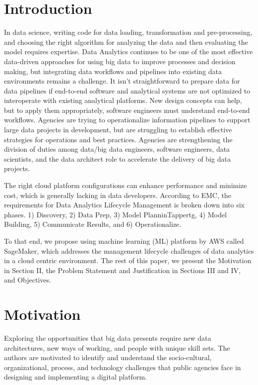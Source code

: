 \documentclass[conference]{IEEEtran}
\begin{document}
\section{Introduction}
In data science, writing code for data loading, transformation and pre-processing, and choosing the right algorithm for analyzing the data and then evaluating the model requires expertise.  Data Analytics continues to be one of the most effective data-driven approaches for using big data to improve processes and decision making, but integrating data workflows and pipelines into existing data environments remains a challenge. It isn't straightforward to prepare data for data pipelines if end-to-end software and analytical systems are not optimized to interoperate with existing analytical platforms. New design concepts can help, but to apply them appropriately, software engineers must understand end-to-end workflows.  Agencies are trying to operationalize information pipelines to support large data projects in development, but are struggling to establish effective strategies for operations and best practices.  Agencies are strengthening the division of duties among data/big data engineers, software engineers, data scientists, and the data architect role to accelerate the delivery of big data projects. 

The right cloud platform configurations can enhance performance and minimize cost, which is generally lacking in data developers. According to EMC\cite{EMC}, the requirements for Data Analytics Lifecycle Management is broken down into six phases. 1) Discovery, 2) Data Prep, 3) Model PlanninTappertg, 4) Model Building, 5) Communicate Results, and 6) Operationalize.

To that end, we propose using machine learning (ML) platform by AWS called SageMaker\cite{SageMaker}, which addresses the management lifecycle challenges of data analytics in a cloud centric environment.  The rest of this paper, we present the Motivation in Section II, the Problem Statement and Justification in Sections III and IV, and Objectives.
%
%
%
\section{Motivation}
Exploring the opportunities that big data presents require new data architectures,  new ways of working, and people with unique skill sets. The authors are motivated to identify and understand the socio-cultural, organizational, process, and technology challenges that public agencies face in designing and implementing a digital platform.  
\end{document}
